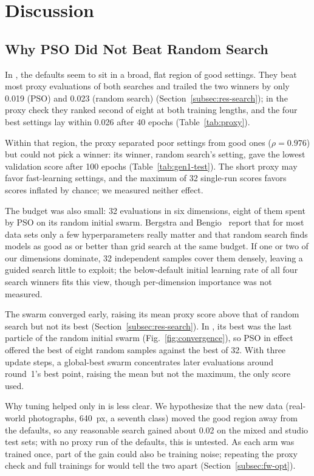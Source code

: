 \section{Discussion}
\label{sec:discussion}

\subsection{Why PSO Did Not Beat Random Search}
\label{subsec:why}

In \genone, the defaults seem to sit in a broad, flat region of good settings. They beat most proxy evaluations of both searches and trailed the two winners by only 0.019 (PSO) and 0.023 (random search) (Section~\ref{subsec:res-search}); in the proxy check they ranked second of eight at both training lengths, and the four best settings lay within 0.026 after 40 epochs (Table~\ref{tab:proxy}).

Within that region, the proxy separated poor settings from good ones ($\rho = 0.976$) but could not pick a winner: its \genone winner, random search's setting, gave the lowest validation score after 100 epochs (Table~\ref{tab:gen1-test}). The short proxy may favor fast-learning settings, and the maximum of 32 single-run scores favors scores inflated by chance; we measured neither effect.

The budget was also small: 32 evaluations in six dimensions, eight of them spent by PSO on its random initial swarm. Bergstra and Bengio~\cite{bergstra2012random} report that for most data sets only a few hyperparameters really matter and that random search finds models as good as or better than grid search at the same budget. If one or two of our dimensions dominate, 32 independent samples cover them densely, leaving a guided search little to exploit; the below-default initial learning rate of all four search winners fits this view, though per-dimension importance was not measured.

The swarm converged early, raising its mean proxy score above that of random search but not its best (Section~\ref{subsec:res-search}). In \gentwo, its best was the last particle of the random initial swarm (Fig.~\ref{fig:convergence}), so PSO in effect offered the best of eight random samples against the best of 32. With three update steps, a global-best swarm concentrates later evaluations around round~1's best point, raising the mean but not the maximum, the only score used.

Why tuning helped only in \gentwo is less clear. We hypothesize that the new data (real-world photographs, 640~px, a seventh class) moved the good region away from the defaults, so any reasonable search gained about 0.02 \mapfifty on the mixed and studio test sets; with no \gentwo proxy run of the defaults, this is untested. As each arm was trained once, part of the gain could also be training noise; repeating the proxy check and full trainings for \gentwo would tell the two apart (Section~\ref{subsec:fw-opt}).

